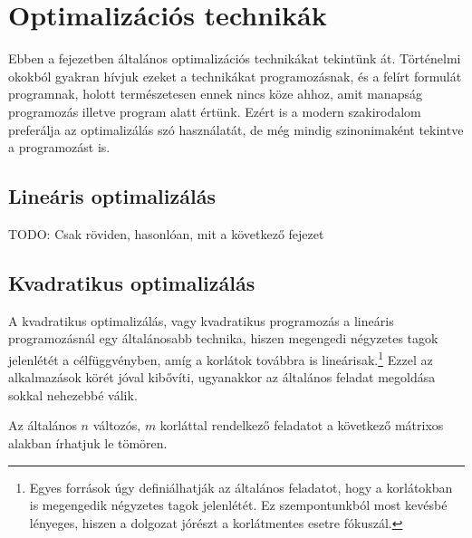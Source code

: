 
\chapter{Optimalizációs technikák}\label{chap:optimalization}
Ebben a fejezetben általános optimalizációs technikákat tekintünk át. Történelmi okokból gyakran hívjuk ezeket a technikákat programozásnak, és a felírt formulát programnak, holott természetesen ennek nincs köze ahhoz, amit manapság programozás illetve program alatt értünk. Ezért is a modern szakirodalom preferálja az optimalizálás szó használatát, de még mindig szinonimaként tekintve a programozást is.



\section{Lineáris optimalizálás}

TODO: Csak röviden, hasonlóan, mit a következő fejezet



\section{Kvadratikus optimalizálás}\label{sec:QuadOpt}

A kvadratikus optimalizálás, vagy kvadratikus programozás a lineáris programozásnál egy általánosabb technika, hiszen megengedi négyzetes tagok jelenlétét a célfüggvényben, amíg a korlátok továbbra is lineárisak.\footnote{Egyes források úgy definiálhatják az általános feladatot, hogy a korlátokban is megengedik négyzetes tagok jelenlétét. Ez szempontunkból most kevésbé lényeges, hiszen a dolgozat jórészt a korlátmentes esetre fókuszál.} Ezzel az alkalmazások körét jóval kibővíti, ugyanakkor az általános feladat megoldása sokkal nehezebbé válik. 

Az általános $n$ változós, $m$ korláttal rendelkező feladatot a következő mátrixos alakban írhatjuk le tömören.

